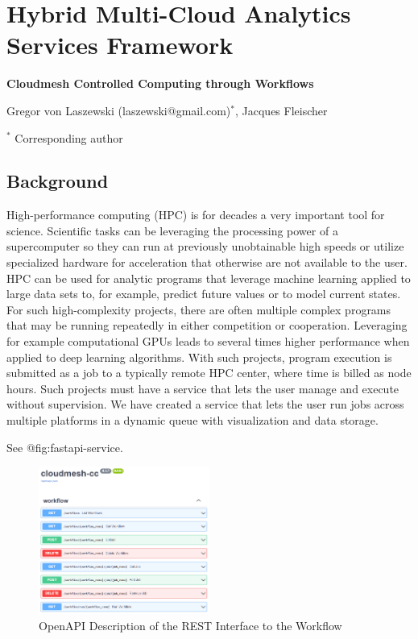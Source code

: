 \hypertarget{hybrid-multi-cloud-analytics-services-framework}{%
\section{Hybrid Multi-Cloud Analytics Services
Framework}\label{hybrid-multi-cloud-analytics-services-framework}}

\textbf{Cloudmesh Controlled Computing through Workflows}

Gregor von Laszewski (laszewski@gmail.com)\(^*\), Jacques Fleischer

\(^*\) Corresponding author

\hypertarget{background}{%
\subsection{Background}\label{background}}

High-performance computing (HPC) is for decades a very important tool
for science. Scientific tasks can be leveraging the processing power of
a supercomputer so they can run at previously unobtainable high speeds
or utilize specialized hardware for acceleration that otherwise are not
available to the user. HPC can be used for analytic programs that
leverage machine learning applied to large data sets to, for example,
predict future values or to model current states. For such
high-complexity projects, there are often multiple complex programs that
may be running repeatedly in either competition or cooperation.
Leveraging for example computational GPUs leads to several times higher
performance when applied to deep learning algorithms. With such
projects, program execution is submitted as a job to a typically remote
HPC center, where time is billed as node hours. Such projects must have
a service that lets the user manage and execute without supervision. We
have created a service that lets the user run jobs across multiple
platforms in a dynamic queue with visualization and data storage.

See @fig:fastapi-service.

\begin{figure}
\hypertarget{fig:fastapi-service}{%
\centering
\includegraphics[width=0.5\textwidth,height=\textheight]{images/fastapi-service.png}
\caption{OpenAPI Description of the REST Interface to the
Workflow}\label{fig:fastapi-service}
}
\end{figure}

